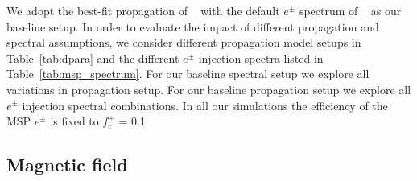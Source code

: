 \documentclass[doublespace,nopageskip]{VTthesis} %
\begin{document}
We adopt the best-fit propagation of ~\citet{2016ApJ...824...16J} with the default $e^\pm$ spectrum of ~\citet{2015ApJ...802..124Y} as our baseline setup. In order to evaluate the impact of different propagation and spectral assumptions, we consider different propagation model setups in Table~\ref{tab:dpara} and the different $e^{\pm}$ injection spectra listed in Table~\ref{tab:msp_spectrum}. For our baseline spectral setup we explore all variations in propagation setup. For our baseline propagation setup we explore all $e^{\pm}$ injection spectral combinations. In all our simulations the efficiency of the MSP $e^\pm$ is fixed to $f_e^\pm$ = 0.1.

\subsection{Magnetic field}\label{sec:bfield}
\end{document}
